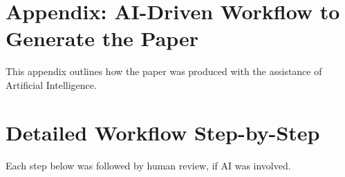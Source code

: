 \documentclass[twocolumn]{article}
\begin{document}
\clearpage

\balance



\clearpage

\appendix

\section{Appendix: AI-Driven Workflow to Generate the Paper}
\label{ai_workflow}

This appendix outlines how the paper was produced with the assistance of Artificial Intelligence.


\section*{Detailed Workflow Step-by-Step}

Each step below was followed by human review, if AI was involved. 
\end{document}
